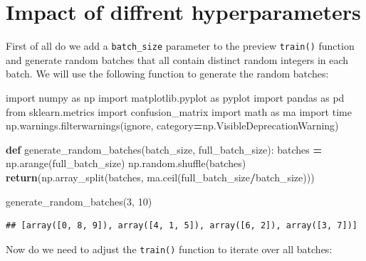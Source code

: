 \documentclass[
]{book}
\newenvironment{Shaded}{\begin{snugshade}}{\end{snugshade}}
\newcommand{\ControlFlowTok}[1]{\textcolor[rgb]{0.13,0.29,0.53}{\textbf{#1}}}
\newcommand{\DecValTok}[1]{\textcolor[rgb]{0.00,0.00,0.81}{#1}}
\newcommand{\ImportTok}[1]{#1}
\newcommand{\KeywordTok}[1]{\textcolor[rgb]{0.13,0.29,0.53}{\textbf{#1}}}
\newcommand{\NormalTok}[1]{#1}
\newcommand{\OperatorTok}[1]{\textcolor[rgb]{0.81,0.36,0.00}{\textbf{#1}}}
\newcommand{\StringTok}[1]{\textcolor[rgb]{0.31,0.60,0.02}{#1}}
\begin{document}
\hypertarget{impact-of-diffrent-hyperparameters}{%
\section{Impact of diffrent hyperparameters}\label{impact-of-diffrent-hyperparameters}}

First of all do we add a \texttt{batch\_size} parameter to the preview \texttt{train()} function and generate random batches that all contain distinct random integers in each batch. We will use the following function to generate the random batches:

\begin{Shaded}
\begin{Highlighting}[]
\ImportTok{import}\NormalTok{ numpy }\ImportTok{as}\NormalTok{ np}
\ImportTok{import}\NormalTok{ matplotlib.pyplot }\ImportTok{as}\NormalTok{ pyplot}
\ImportTok{import}\NormalTok{ pandas }\ImportTok{as}\NormalTok{ pd}
\ImportTok{from}\NormalTok{ sklearn.metrics }\ImportTok{import}\NormalTok{ confusion\_matrix}
\ImportTok{import}\NormalTok{ math }\ImportTok{as}\NormalTok{ ma}
\ImportTok{import}\NormalTok{ time}
\NormalTok{np.warnings.filterwarnings(}\StringTok{\textquotesingle{}ignore\textquotesingle{}}\NormalTok{, category}\OperatorTok{=}\NormalTok{np.VisibleDeprecationWarning) }

\KeywordTok{def}\NormalTok{ generate\_random\_batches(batch\_size, full\_batch\_size):}
\NormalTok{  batches }\OperatorTok{=}\NormalTok{ np.arange(full\_batch\_size)}
\NormalTok{  np.random.shuffle(batches)}
  \ControlFlowTok{return}\NormalTok{(np.array\_split(batches, ma.ceil(full\_batch\_size}\OperatorTok{/}\NormalTok{batch\_size)))}

\NormalTok{generate\_random\_batches(}\DecValTok{3}\NormalTok{, }\DecValTok{10}\NormalTok{)}
\end{Highlighting}
\end{Shaded}

\begin{verbatim}
## [array([0, 8, 9]), array([4, 1, 5]), array([6, 2]), array([3, 7])]
\end{verbatim}

Now do we need to adjust the \texttt{train()} function to iterate over all batches:
\end{document}
